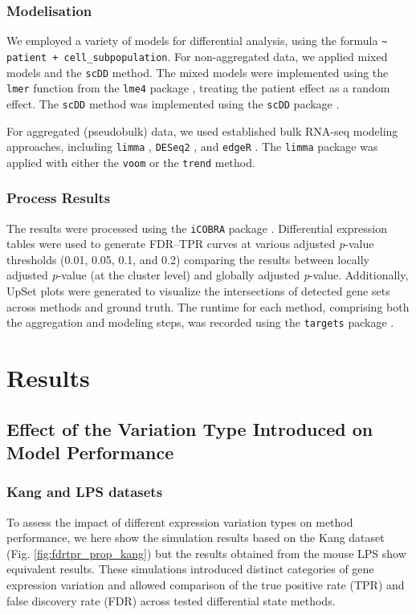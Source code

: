 \documentclass[a4paper, 11pt, twocolumn]{article}
\begin{document}
\begin{multicols}{2}
\subsubsection{Modelisation}

We employed a variety of models for differential analysis, using the formula \texttt{\textasciitilde{} patient + cell\_subpopulation}. For non-aggregated data, we applied mixed models and the \texttt{scDD} method. The mixed models were implemented using the \texttt{lmer} function from the \texttt{lme4} package \citep{lme4}, treating the patient effect as a random effect. The \texttt{scDD} method was implemented using the \texttt{scDD} package \citep{scdd}.

For aggregated (pseudobulk) data, we used established bulk RNA-seq modeling approaches, including \texttt{limma} \citep{limma}, \texttt{DESeq2} \citep{deseq2}, and \texttt{edgeR} \citep{edger}. The \texttt{limma} package was applied with either the \texttt{voom} or the \texttt{trend} method.

\subsubsection{Process Results}

The results were processed using the \texttt{iCOBRA} package \citep{icobra}. Differential expression tables were used to generate FDR–TPR curves at various adjusted \textit{p}-value thresholds (0.01, 0.05, 0.1, and 0.2) comparing the results between locally adjusted \textit{p}-value (at the cluster level) and globally adjusted \textit{p}-value. Additionally, UpSet plots were generated to visualize the intersections of detected gene sets across methods and ground truth. The runtime for each method, comprising both the aggregation and modeling steps, was recorded using the \texttt{targets} package \citep{targets}.
	
\section{Results}

\subsection{Effect of the Variation Type Introduced on Model Performance}

\subsubsection{Kang and LPS datasets}
To assess the impact of different expression variation types on method performance, we here show the simulation results based on the Kang dataset (Fig. \ref{fig:fdrtpr_prop_kang}) but the results obtained from the mouse LPS show equivalent results. These simulations introduced distinct categories of gene expression variation and allowed comparison of the true positive rate (TPR) and false discovery rate (FDR) across tested differential state methods.


\end{multicols}
\end{document}
